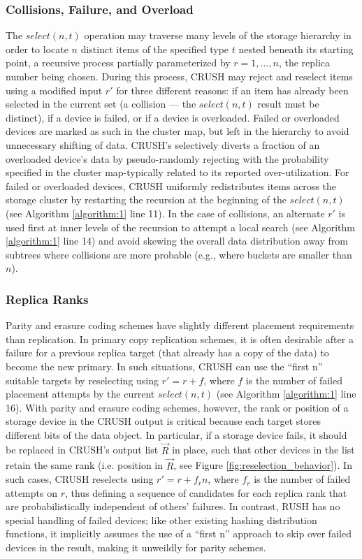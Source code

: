 \documentclass[12pt,a4paper]{report}
\begin{document}
\subsubsection{Collisions, Failure, and Overload}
The $select(n,t)$ operation may traverse many levels of the storage hierarchy
in order to locate $n$ distinct items of the specified type $t$ nested beneath
its starting point, a recursive process partially parameterized by $r =
1,\dots,n$, the replica number being chosen. During this process, CRUSH may
reject and reselect items using a modified input $r'$ for three different
reasons: if an item has already been selected in the current set (a collision
--- the $select(n,t)$ result must be distinct), if a device is failed, or if a
device is overloaded. Failed or overloaded devices are marked as such in the
cluster map, but left in the hierarchy to avoid unnecessary shifting of data.
CRUSH’s selectively diverts a fraction of an overloaded device’s data by
pseudo-randomly rejecting with the probability specified in the cluster
map-typically related to its reported over-utilization. For failed or
overloaded devices, CRUSH uniformly redistributes items across the storage
cluster by restarting the recursion at the beginning of the $select(n, t)$ (see
Algorithm \ref{algorithm:1} line 11). In the case of collisions, an alternate
$r'$ is used first at inner levels of the recursion to attempt a local search
(see Algorithm \ref{algorithm:1} line 14) and avoid skewing the overall data
distribution away from subtrees where collisions are more probable (e.g., where
buckets are smaller than $n$).

\subsubsection{Replica Ranks}
Parity and erasure coding schemes have slightly different placement
requirements than replication. In primary copy replication schemes, it is often
desirable after a failure for a previous replica target (that already has a
copy of the data) to become the new primary. In such situations, CRUSH can use
the ``first n'' suitable targets by reselecting using $r' = r + f$, where $f$
is the number of failed placement attempts by the current $select(n,t)$ (see
Algorithm \ref{algorithm:1} line 16). With parity and erasure coding schemes,
however, the rank or position of a storage device in the CRUSH output is
critical because each target stores different bits of the data object. In
particular, if a storage device fails, it should be replaced in CRUSH’s output
list $\vec{R}$ in place, such that other devices in the list retain the same
rank (i.e. position in $\vec{R}$, see Figure \ref{fig:reselection_behavior}). In such cases, CRUSH reselects
using $r' = r + f_rn$, where $f_r$ is the number of failed attempts on $r$,
thus defining a sequence of candidates for each replica rank that are
probabilistically independent of others’ failures. In contrast, RUSH has no
special handling of failed devices; like other existing hashing distribution
functions, it implicitly assumes the use of a ``first n'' approach to skip over
failed devices in the result, making it unweildly for parity schemes.
\end{document}
